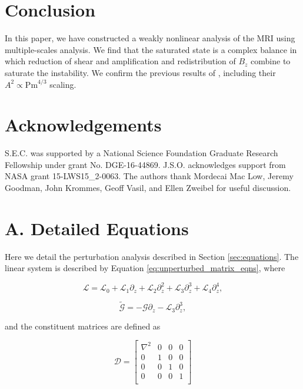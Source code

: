 \documentclass{emulateapj}
\newcommand{\beq}{\begin{equation}}
\newcommand{\eeq}{\end{equation}}
\newcommand{\Pm}{\mathrm{Pm}}
\begin{document}
\section{Conclusion}
\label{sec:conclusion}

In this paper, we have constructed a weakly nonlinear analysis of the MRI using multiple-scales analysis. We find that the saturated state is a complex balance in which reduction of shear and amplification and redistribution of $B_z$ combine to saturate the instability. We confirm the previous results of \citet{Umurhan:2007hs}, including their $A^2 \propto \Pm^{4/3} $ scaling. 

\section{Acknowledgements}
S.E.C. was supported by a National Science Foundation Graduate Research Fellowship under grant No. DGE-16-44869. J.S.O. acknowledges support from NASA grant 15-LWS15\_2-0063. The authors thank Mordecai Mac Low, Jeremy Goodman, John Krommes, Geoff Vasil, and Ellen Zweibel for useful discussion.


\clearpage
\appendix

\section{A. Detailed Equations}\label{app:matrices}

Here we detail the perturbation analysis described in Section \ref{sec:equations}. The linear system is described by Equation \ref{eq:unperturbed_matrix_eqns}, where 

\beq
\mathcal{L} = \mathcal{L}_0 + \mathcal{L}_1 \partial_z + \mathcal{L}_2 \partial_z^2 + \mathcal{L}_3 \partial_z^3 + \mathcal{L}_4 \partial_z^4,
\eeq

\beq
\widetilde{\mathcal{G}} = - \mathcal{G} \partial_z - \mathcal{L}_3 \partial_z^3,
\eeq

and the constituent matrices are defined as 

\beq
\mathcal{D} = \left[\begin{matrix}
\nabla^2 & 0 & 0 & 0 \\
0 & 1& 0 & 0 \\
0 & 0 & 1 & 0\\
0 & 0 & 0 & 1 \\
\end{matrix}\right]
\eeq
\end{document}
